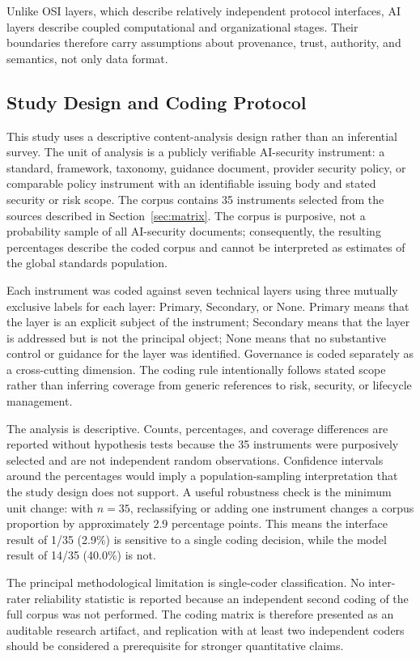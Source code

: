 \documentclass[runningheads]{llncs}
\begin{document}
Unlike OSI layers, which describe relatively independent protocol interfaces, AI layers describe coupled computational and organizational stages. Their boundaries therefore carry assumptions about provenance, trust, authority, and semantics, not only data format.

\subsection{Study Design and Coding Protocol}
\label{sec:method}

This study uses a descriptive content-analysis design rather than an inferential survey. The unit of analysis is a publicly verifiable AI-security instrument: a standard, framework, taxonomy, guidance document, provider security policy, or comparable policy instrument with an identifiable issuing body and stated security or risk scope. The corpus contains 35 instruments selected from the sources described in Section~\ref{sec:matrix}. The corpus is purposive, not a probability sample of all AI-security documents; consequently, the resulting percentages describe the coded corpus and cannot be interpreted as estimates of the global standards population.

Each instrument was coded against seven technical layers using three mutually exclusive labels for each layer: Primary, Secondary, or None. Primary means that the layer is an explicit subject of the instrument; Secondary means that the layer is addressed but is not the principal object; None means that no substantive control or guidance for the layer was identified. Governance is coded separately as a cross-cutting dimension. The coding rule intentionally follows stated scope rather than inferring coverage from generic references to risk, security, or lifecycle management.

The analysis is descriptive. Counts, percentages, and coverage differences are reported without hypothesis tests because the 35 instruments were purposively selected and are not independent random observations. Confidence intervals around the percentages would imply a population-sampling interpretation that the study design does not support. A useful robustness check is the minimum unit change: with $n=35$, reclassifying or adding one instrument changes a corpus proportion by approximately 2.9 percentage points. This means the interface result of 1/35 (2.9\%) is sensitive to a single coding decision, while the model result of 14/35 (40.0\%) is not.

The principal methodological limitation is single-coder classification. No inter-rater reliability statistic is reported because an independent second coding of the full corpus was not performed. The coding matrix is therefore presented as an auditable research artifact, and replication with at least two independent coders should be considered a prerequisite for stronger quantitative claims.
\end{document}
